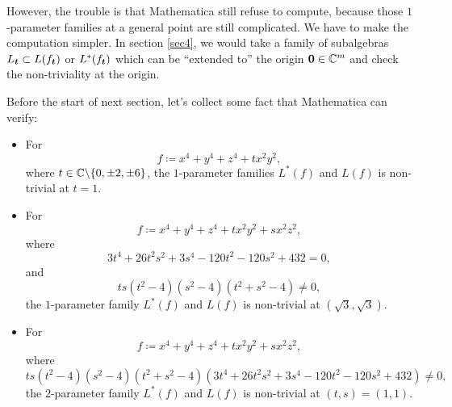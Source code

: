 However, the trouble is that Mathematica still refuse to compute, because those $1$-parameter families at a general point are still complicated. We have to make the computation simpler. In section \ref{sec4}, we would take a family of subalgebras $L_{\boldsymbol t}\subset L(f_{\boldsymbol t})$ or $L^*(f_{\boldsymbol t})$ which can be ``extended to'' the origin ${\boldsymbol 0}\in {\mathbb{C}}^m$ and check the non-triviality at the origin. 

Before the start of next section, let's collect some fact that Mathematica can verify: 
\begin{itemize}
  \item For
    \[f\coloneq x^4+y^4+z^4+tx^2y^2,\]
    where $t \in {\mathbb{C}}\backslash\{0,\pm2,\pm6\}$, the $1$-parameter families $L^*(f)$ and $L(f)$ is non-trivial at $t=1$. 
  \item For
    \[f\coloneq x^4+y^4+z^4+tx^2y^2+sx^2z^2,\]
    where
    \[3t^4+26t^2s^2+3s^4-120t^2-120s^2+432
    =0,\]
    and
    \[ts\left( t^2-4\right)\left( s^2-4\right)\left( t^2+s^2-4\right) \not=0,\] 
    the $1$-parameter family $L^*(f)$ and $L(f)$ is non-trivial at  $\left(\sqrt 3,\sqrt 3\right)$.
  \item  For
    \[f\coloneq x^4+y^4+z^4+tx^2y^2+sx^2z^2,\]
    where
    \[ts( t^2-4)( s^2-4)( t^2+s^2-4)(3t^4+26t^2s^2+3s^4-120t^2-120s^2 +432)
    \not=0,\]
    the $2$-parameter family  $L^*(f)$ and $L(f)$ is non-trivial at $(t,s)=(1,1)$.
\end{itemize}
